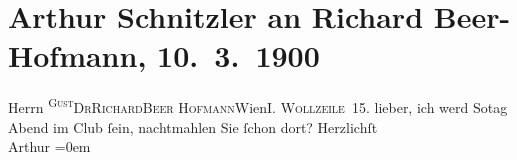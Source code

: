 

         
         \renewcommand{\erwaehntePersonen}{Personen: Richard Beer-Hofmann}
         \renewcommand{\erwaehnteInstitutionen}{Institutionen: Wiener Schachclub}
         \renewcommand{\erwaehnteOrte}{Orte: I., Innere Stadt, Wien, Wollzeile}
         \renewcommand{\erwaehnteWerke}{}
               \section[Arthur Schnitzler an Richard Beer-Hofmann, 10. 3. 1900]{ Arthur Schnitzler an Richard Beer-Hofmann, 10. 3. 1900}\nopagebreak{}\rehead{ }\begin{ledgroupsized}[t]{13cm}\normalsize\beginnumbering \toendnotes[C]{\smallbreak\pagebreak[2]} 
\toendnotes[C]{\smallbreak}\pstart{}{\pb}Herrn \substVorne{}\textsuperscript{\textsc{Gust}}\substDazwischen{}\textsc{Dr}\substHinten{}\textsc{Richard}\pend{}\pstart{}\textsc{Beer Hofmann}\pend{}\pstart{}Wien\pend{}\pstart{}\textsc{I. Wollzeile 15.}\pend{}{\bigskip}\pstart
           \noindent{}{\pb}lieber, ich werd So{\geminationn}tag Abend im Club ſein, nachtmahlen Sie ſchon
               dort?\pend
           \pstart
           Herzlichſt{\\[\baselineskip]}\spacefill\mbox{Arthur}\pend
           \leftskip=0em{}
         
         \endnumbering{}\end{ledgroupsized}  \newcommand{\dateiname}{L01020}\newcommand{\titel}{Arthur Schnitzler an Richard Beer-Hofmann, 10. 3. 1900}\newcommand{\editorInnen}{Martin Anton Müller und Gerd-Hermann Susen}
      